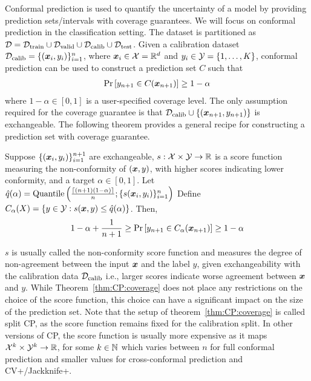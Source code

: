 Conformal prediction is used to quantify the uncertainty of a model by providing prediction sets/intervals with coverage guarantees.
We will focus on conformal prediction in the classification setting.
The dataset is partitioned as $\mathcal{D} = {\mathcal{D}}_{\text{train}}\cup {\mathcal{D}}_{\text{valid}}\cup {\mathcal{D}}_{\text{calib}}\cup  {\mathcal{D}}_{\text{test}}$.
Given a calibration dataset $\mathcal{D_{\mathrm{calib}}} = \{({\bm{x}}_i, y_i)\}_{i=1}^n$, where ${\bm{x}}_i \in {\mathcal{X}} = \mathbb{R}^d$ and $y_i \in {\mathcal{Y}} = \{1, \dots, K\}$, conformal prediction can be used to construct a prediction set $C$ such that
\begin{align*}
    \Pr\left[y_{n+1} \in C({\bm{x}}_{n+1}) \right] \geq 1 - \alpha
\end{align*}
where $1 - \alpha \in [0, 1]$ is a user-specified coverage level.
The only assumption required for the coverage guarantee is that $\mathcal{D_{\mathrm{calib}}} \cup \{({\bm{x}}_{n+1}, y_{n+1})\}$ is exchangeable.
The following theorem provides a general recipe for constructing a prediction set with coverage guarantee.
\begin{theorem}
    Suppose $\{({\bm{x}}_i, y_i)\}_{i=1}^{n+1}$ are exchangeable, $s: {\mathcal{X}} \times {\mathcal{Y}} \rightarrow \mathbb{R}$ is a score function measuring the non-conformity of $({\bm{x}}, y)$, with higher scores indicating lower conformity, and a target $\alpha \in [0, 1]$. %
    Let $\hat{q}(\alpha) = \text{Quantile}\left(\frac{\lceil(n+1)(1-\alpha)\rceil}{n}; \{s({\bm{x}}_i, y_i)\}_{i=1}^{n}\right)$
    Define $C_{\alpha}(X) = \{y \in {\mathcal{Y}}: s({\bm{x}}, y) \leq \hat{q}(\alpha)\}$.
    Then,
    \begin{align}
        1 - \alpha +\frac{1}{n+1} \geq \Pr\left[y_{n+1} \in C_{\alpha}({\bm{x}}_{n+1}) \right] \geq 1 - \alpha
        \label{eq:CP:coverage}
    \end{align}
    \label{thm:CP:coverage}
\end{theorem}

$s$ is usually called the non-conformity score function and measures the degree of non-agreement between the input ${\bm{x}}$ and the label $y$, given exchangeability with the calibration data $\mathcal{D_{\mathrm{calib}}}$ i.e., larger scores indicate worse agreement between ${\bm{x}}$ and $y$.
While Theorem~\ref{thm:CP:coverage} does not place any restrictions on the choice of the score function, this choice can have a significant impact on the size of the prediction set.
Note that the setup of theorem~\ref{thm:CP:coverage} is called split CP, as the score function remains fixed for the calibration split.
In other versions of CP, the score function is usually more expensive as it maps ${\mathcal{X}}^k \times {\mathcal{Y}}^k \rightarrow \mathbb{R}$, for some $k \in \mathbb{N}$ which varies between $n$ for full conformal prediction and smaller values for cross-conformal prediction and CV+/Jackknife+.

